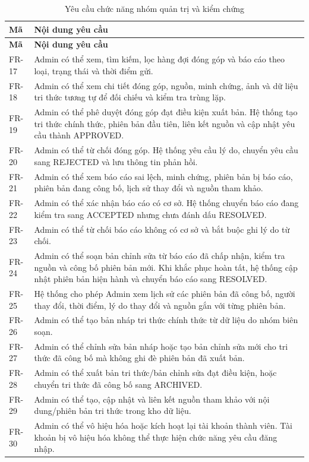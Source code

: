 \begin{longtable}{|L{20mm}|L{124mm}|}
\caption{Yêu cầu chức năng nhóm quản trị và kiểm chứng}\label{tab:chapter3-fr-17}\\\hline
{}\textbf{Mã} & \textbf{Nội dung yêu cầu}\\\hline
\endfirsthead
\hline
{}\textbf{Mã} & \textbf{Nội dung yêu cầu}\\\hline
\endhead
\endfoot
FR-17 & Admin có thể xem, tìm kiếm, lọc hàng đợi đóng góp và báo cáo theo loại, trạng thái và thời điểm gửi.\\\hline
FR-18 & Admin có thể xem chi tiết đóng góp, nguồn, minh chứng, ảnh và dữ liệu tri thức tương tự để đối chiếu và kiểm tra trùng lặp.\\\hline
FR-19 & Admin có thể phê duyệt đóng góp đạt điều kiện xuất bản. Hệ thống tạo tri thức chính thức, phiên bản đầu tiên, liên kết nguồn và cập nhật yêu cầu thành APPROVED.\\\hline
FR-20 & Admin có thể từ chối đóng góp. Hệ thống yêu cầu lý do, chuyển yêu cầu sang REJECTED và lưu thông tin phản hồi.\\\hline
FR-21 & Admin có thể xem báo cáo sai lệch, minh chứng, phiên bản bị báo cáo, phiên bản đang công bố, lịch sử thay đổi và nguồn tham khảo.\\\hline
FR-22 & Admin có thể xác nhận báo cáo có cơ sở. Hệ thống chuyển báo cáo đang kiểm tra sang ACCEPTED nhưng chưa đánh dấu RESOLVED.\\\hline
FR-23 & Admin có thể từ chối báo cáo không có cơ sở và bắt buộc ghi lý do từ chối.\\\hline
FR-24 & Admin có thể soạn bản chỉnh sửa từ báo cáo đã chấp nhận, kiểm tra nguồn và công bố phiên bản mới. Khi khắc phục hoàn tất, hệ thống cập nhật phiên bản hiện hành và chuyển báo cáo sang RESOLVED.\\\hline
FR-25 & Hệ thống cho phép Admin xem lịch sử các phiên bản đã công bố, người thay đổi, thời điểm, lý do thay đổi và nguồn gắn với từng phiên bản.\\\hline
FR-26 & Admin có thể tạo bản nháp tri thức chính thức từ dữ liệu do nhóm biên soạn.\\\hline
FR-27 & Admin có thể chỉnh sửa bản nháp hoặc tạo bản chỉnh sửa mới cho tri thức đã công bố mà không ghi đè phiên bản đã xuất bản.\\\hline
FR-28 & Admin có thể xuất bản tri thức/bản chỉnh sửa đạt điều kiện, hoặc chuyển tri thức đã công bố sang ARCHIVED.\\\hline
FR-29 & Admin có thể tạo, cập nhật và liên kết nguồn tham khảo với nội dung/phiên bản tri thức trong kho dữ liệu.\\\hline
FR-30 & Admin có thể vô hiệu hóa hoặc kích hoạt lại tài khoản thành viên. Tài khoản bị vô hiệu hóa không thể thực hiện chức năng yêu cầu đăng nhập.\\\hline
\end{longtable}

